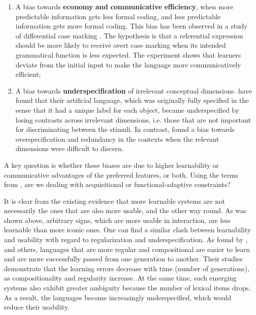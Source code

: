 \documentclass[output=paper]{langsci/langscibook}
\begin{document}
\begin{enumerate}
\item 
A bias towards \textbf{economy} \textbf{and} \textbf{communicative} \textbf{efficiency}, when more predictable information gets less formal coding, and less predictable information gets more formal coding. This bias has been observed in a study of differential case marking \citep{FedzechkinaEtAl2012}. The hypothesis is that a referential expression should be more likely to receive overt case marking when its intended grammatical function is less expected. The experiment shows that learners deviate from the initial input to make the language more communicatively efficient;
\item 
A bias towards \textbf{underspecification} of irrelevant conceptual dimensions. \citet{SilveyEtAl2015} have found that their artificial language, which was originally fully specified in the sense that it had a unique label for each object, became underspecified by losing contrasts across irrelevant dimensions, i.e. those that are not important for discriminating between the stimuli. In contrast, \citet{TinitsEtAl2017} found a bias towards overspecification and redundancy in the contexts when the relevant dimensions were difficult to discern.  
\end{enumerate}

A key question is whether these biases are due to higher learnability or communicative advantages of the preferred features, or both. Using the terms from , are we dealing with acquisitional or functional-adaptive constraints? 

It is clear from the existing evidence that more learnable systems are not necessarily the ones that are also more usable, and the other way round. As was shown above, arbitrary signs, which are more usable in interaction, are less learnable than more iconic ones. One can find a similar clash between learnability and usability with regard to regularization and underspecification. As found by \citet{KirbyEtAl2008}, \citet{Verhoef2012} and others, languages that are more regular and compositional are easier to learn and are more successfully passed from one generation to another. Their studies demonstrate that the learning errors decrease with time (number of generations), as compositionality and regularity increase. At the same time, such emerging systems also exhibit greater ambiguity because the number of lexical items drops. As a result, the languages become increasingly underspecified, which would reduce their usability. 
\end{document}
